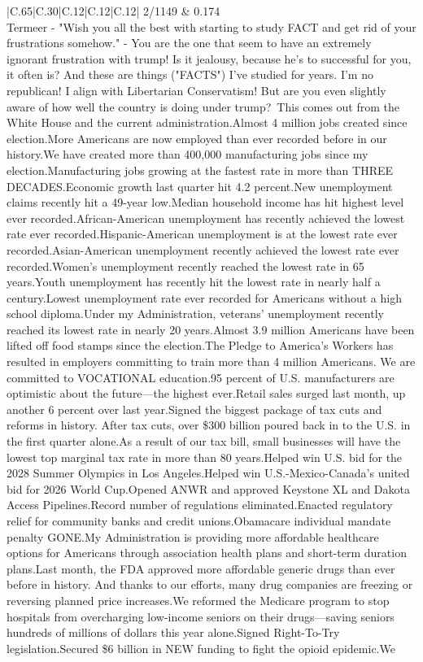 \documentclass[11pt]{article}
\newlength\mylength
\begin{document}
\begin{center}
\begin{longtable}{|C{.65\mylength}|C{.30\mylength}|C{.12\mylength}|C{.12\mylength}|C{.12\mylength}|}
2/1149 & 0.174 \\  \hline
  \small \@Geert Termeer  - "Wish you all the best with starting to study FACT and get rid of your frustrations somehow." - You are the one that seem to have an extremely ignorant frustration with trump! Is it jealousy, because he's to successful for you, it often is? And these are things ("FACTS") I've studied for years. I'm no republican! I align with Libertarian Conservatism! But are you even slightly aware of how well the country is doing under trump? This comes out from the White House and the current administration.Almost 4 million jobs created since election.More Americans are now employed than ever recorded before in our history.We have created more than 400,000 manufacturing jobs since my election.Manufacturing jobs growing at the fastest rate in more than THREE DECADES.Economic growth last quarter hit 4.2 percent.New unemployment claims recently hit a 49-year low.Median household income has hit highest level ever recorded.African-American unemployment has recently achieved the lowest rate ever recorded.Hispanic-American unemployment is at the lowest rate ever recorded.Asian-American unemployment recently achieved the lowest rate ever recorded.Women's unemployment recently reached the lowest rate in 65 years.Youth unemployment has recently hit the lowest rate in nearly half a century.Lowest unemployment rate ever recorded for Americans without a high school diploma.Under my Administration, veterans' unemployment recently reached its lowest rate in nearly 20 years.Almost 3.9 million Americans have been lifted off food stamps since the election.The Pledge to America's Workers has resulted in employers committing to train more than 4 million Americans. We are committed to VOCATIONAL education.95 percent of U.S. manufacturers are optimistic about the future—the highest ever.Retail sales surged last month, up another 6 percent over last year.Signed the biggest package of tax cuts and reforms in history. After tax cuts, over \$300 billion poured back in to the U.S. in the first quarter alone.As a result of our tax bill, small businesses will have the lowest top marginal tax rate in more than 80 years.Helped win U.S. bid for the 2028 Summer Olympics in Los Angeles.Helped win U.S.-Mexico-Canada's united bid for 2026 World Cup.Opened ANWR and approved Keystone XL and Dakota Access Pipelines.Record number of regulations eliminated.Enacted regulatory relief for community banks and credit unions.Obamacare individual mandate penalty GONE.My Administration is providing more affordable healthcare options for Americans through association health plans and short-term duration plans.Last month, the FDA approved more affordable generic drugs than ever before in history. And thanks to our efforts, many drug companies are freezing or reversing planned price increases.We reformed the Medicare program to stop hospitals from overcharging low-income seniors on their drugs—saving seniors hundreds of millions of dollars this year alone.Signed Right-To-Try legislation.Secured \$6 billion in NEW funding to fight the opioid epidemic.We 
\end{longtable}
\end{center}
\end{document}

